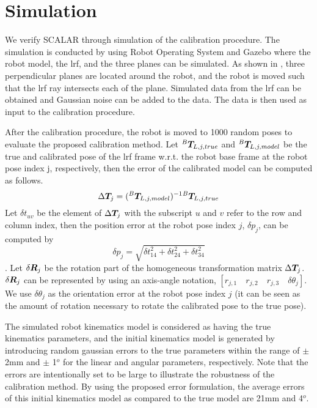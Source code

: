 \section{Simulation}
\label{sec:simulation}

We verify SCALAR through simulation of the calibration procedure. The simulation is conducted by using Robot Operating System and Gazebo where the robot model, the \ac{lrf}, and the three planes can be simulated.  
As shown in , three perpendicular planes are located around the robot, and the robot is moved such that the \ac{lrf} ray intersects each of the plane. Simulated data from the \ac{lrf} can be obtained and Gaussian noise can be added to the data. The data is then used as input to the calibration procedure. 

After the calibration procedure, the robot is moved to 1000 random poses to evaluate the proposed calibration method. Let ${^B}\vb*{T}_{L,j,true}$ and ${^B}\vb*{T}_{L,j,model}$ be the true and calibrated pose of the \ac{lrf} frame w.r.t. the robot base frame at the robot pose index j, respectively, then the error of the calibrated model can be computed as follows. 
\begin{equation}
\Delta \vb*{T}_j =  ({^B}\vb*{T}_{L,j,model})^{-1} {^B}\vb*{T}_{L,j,true}
\end{equation}
Let $\delta t_{uv}$ be the element of $\Delta \vb*{T}_j$ with the subscript $u$ and $v$ refer to the row and column index, then the position error at the robot pose index $j$, $\delta p_j$, can be computed by
\begin{equation}
\delta p_j = \sqrt{\delta t_{14}^2 + \delta t_{24}^2 + \delta t_{34}^2}
\end{equation}.
Let $\delta \vb*{R}_j$ be the rotation part of the homogeneous transformation matrix $\Delta \vb*{T}_j$. $\delta \vb*{R}_j$ can be represented by using an axis-angle notation, $[r_{j,1}\quad r_{j,2}\quad r_{j,3}\quad \delta \theta_j]$. We use $\delta\theta_j$ as the orientation error at the robot pose index $j$ (it can be seen as the amount of rotation necessary to rotate the calibrated pose to the true pose). 

The simulated robot kinematics model is considered as having the true kinematics parameters, and the initial kinematics model is generated by introducing random gaussian errors to the true parameters within the range of $\pm$ 2mm and $\pm$ 1$^o$ for the linear and angular parameters, respectively. Note that the errors are intentionally set to be large to illustrate the robustness of the calibration method. By using the proposed error formulation, the average errors of this initial kinematics model as compared to the true model are 21mm and 4$^o$.


